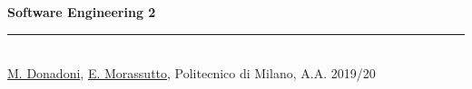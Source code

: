 



\raggedright
\footnotesize
\begin{multicols}{3}

\setlength{\premulticols}{1pt}
\setlength{\postmulticols}{1pt}
\setlength{\multicolsep}{1pt}
\setlength{\columnsep}{2pt}

{\Large{\textbf{Software Engineering 2}}}








\vfill
\rule{\linewidth}{0.25pt}
\scriptsize\\
\href{mailto:marco.donadoni@mail.polimi.it}{M. Donadoni}, \href{mailto:edoardo.morassutto@mail.polimi.it}{E. Morassutto}, Politecnico di Milano, A.A. 2019/20
\vfill\null
\columnbreak
\vfill\null
\columnbreak
\vfill\null
\columnbreak
\end{multicols}



